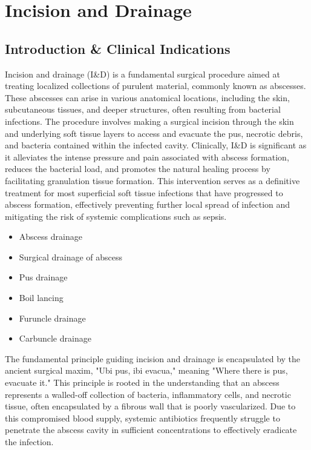 \chapter{Incision and Drainage}

\section*{Introduction \& Clinical Indications}
Incision and drainage (I\&D) is a fundamental surgical procedure aimed at treating localized collections of purulent material, commonly known as abscesses. These abscesses can arise in various anatomical locations, including the skin, subcutaneous tissues, and deeper structures, often resulting from bacterial infections. The procedure involves making a surgical incision through the skin and underlying soft tissue layers to access and evacuate the pus, necrotic debris, and bacteria contained within the infected cavity. Clinically, I\&D is significant as it alleviates the intense pressure and pain associated with abscess formation, reduces the bacterial load, and promotes the natural healing process by facilitating granulation tissue formation. This intervention serves as a definitive treatment for most superficial soft tissue infections that have progressed to abscess formation, effectively preventing further local spread of infection and mitigating the risk of systemic complications such as sepsis.

\begin{itemize}
  \item Abscess drainage
  \item Surgical drainage of abscess
  \item Pus drainage
  \item Boil lancing
  \item Furuncle drainage
  \item Carbuncle drainage
\end{itemize}

The fundamental principle guiding incision and drainage is encapsulated by the ancient surgical maxim, "Ubi pus, ibi evacua," meaning "Where there is pus, evacuate it." This principle is rooted in the understanding that an abscess represents a walled-off collection of bacteria, inflammatory cells, and necrotic tissue, often encapsulated by a fibrous wall that is poorly vascularized. Due to this compromised blood supply, systemic antibiotics frequently struggle to penetrate the abscess cavity in sufficient concentrations to effectively eradicate the infection.

